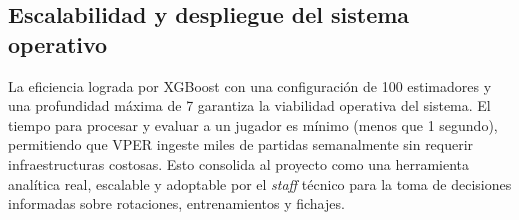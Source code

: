\documentclass{ULBreport} %
\begin{document}
\subsection{Escalabilidad y despliegue del sistema operativo}

La eficiencia lograda por XGBoost con una configuración de 100 estimadores y una profundidad máxima de 7 garantiza la viabilidad operativa del sistema. El tiempo para procesar y evaluar a un jugador es mínimo (menos que 1 segundo), permitiendo que VPER ingeste miles de partidas semanalmente sin requerir infraestructuras costosas. Esto consolida al proyecto como una herramienta analítica real, escalable y adoptable por el \textit{staff} técnico para la toma de decisiones informadas sobre rotaciones, entrenamientos y fichajes.


\newpage
\begingroup
\sloppy
\end{document}
